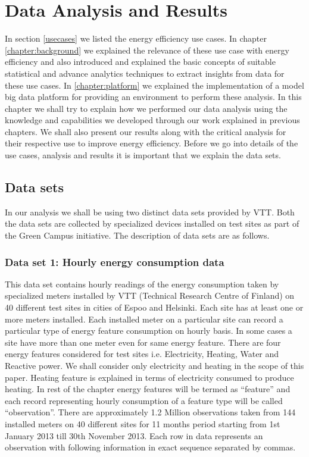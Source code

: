 \chapter{Data Analysis and Results}
\label{chapter:Analysis}

In section \ref{usecases} we listed the energy efficiency use cases. In chapter \ref{chapter:background} we explained the relevance of these use case with energy efficiency and also introduced and explained the basic concepts of suitable statistical and advance analytics techniques to extract insights from data for these use cases. In \ref{chapter:platform} we explained the implementation of a model big data platform for providing an environment to perform these analysis. In this chapter we shall try to explain how we performed our data analysis using the knowledge and capabilities we developed through our work explained in previous chapters. We shall also present our results along with the critical analysis for their respective use to improve energy efficiency. Before we go into details of the use cases, analysis and results it is important that we explain the data sets.

\section{Data sets} \label{datasets}
In our analysis we shall be using two distinct data sets provided by VTT. Both the data sets are collected by specialized devices installed on test sites as part of the Green Campus initiative. The description of data sets are as follows.

\subsection{Data set 1: Hourly energy consumption data}
This data set contains hourly readings of the energy consumption taken by specialized meters installed by VTT (Technical Research Centre of Finland) on 40 different test sites in cities of Espoo and Helsinki. Each site has at least one or more meters installed. Each installed meter on a particular site can record a particular type of energy feature consumption on hourly basis. In some cases a site have more than one meter even for same energy feature. There are four energy features considered for test sites i.e. Electricity, Heating, Water and Reactive power. We shall consider only electricity and heating in the scope of this paper. Heating feature is explained in terms of electricity consumed to produce heating.  In rest of the chapter energy features will be termed as ``feature'' and each record representing hourly consumption of a feature type will be called ``observation''.
There are approximately 1.2 Million observations taken from 144 installed meters on 40 different sites for 11 months period starting from 1st January 2013 till 30th November 2013.  Each row in data represents an observation with following information in exact sequence separated by commas. 

